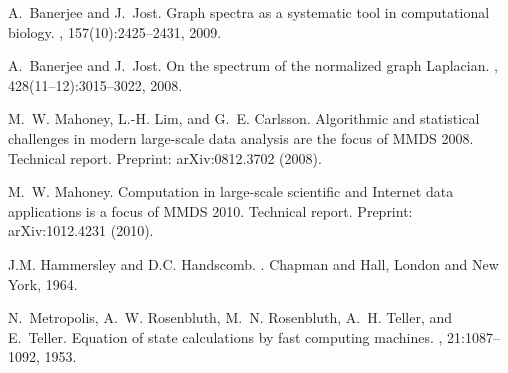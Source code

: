 \documentclass[twoside]{article}
\begin{document}
\begin{small}
\begin{thebibliography}{100}
A.~Banerjee and J.~Jost.
\newblock Graph spectra as a systematic tool in computational biology.
, 157(10):2425--2431, 2009.

A.~Banerjee and J.~Jost.
\newblock On the spectrum of the normalized graph {L}aplacian.
, 428(11--12):3015--3022,
  2008.

M.~W. Mahoney, L.-H. Lim, and G.~E. Carlsson.
\newblock Algorithmic and statistical challenges in modern large-scale data
  analysis are the focus of {MMDS} 2008.
\newblock Technical report.
\newblock Preprint: arXiv:0812.3702 (2008).

M.~W. Mahoney.
\newblock Computation in large-scale scientific and {I}nternet data
  applications is a focus of {MMDS} 2010.
\newblock Technical report.
\newblock Preprint: arXiv:1012.4231 (2010).

J.M. Hammersley and D.C. Handscomb.
.
\newblock Chapman and Hall, London and New York, 1964.

N.~Metropolis, A.~W. Rosenbluth, M.~N. Rosenbluth, A.~H. Teller, and E.~Teller.
\newblock Equation of state calculations by fast computing machines.
, 21:1087--1092, 1953.

\end{thebibliography}
\end{small}
\end{document}
